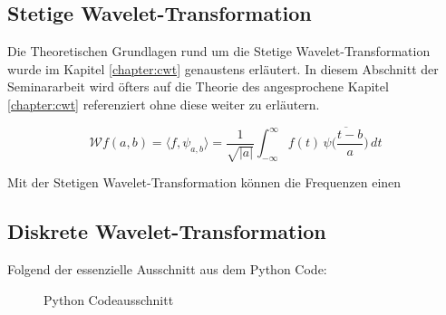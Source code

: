 
\subsection{Stetige Wavelet-Transformation}
Die Theoretischen Grundlagen rund um die Stetige Wavelet-Transformation wurde im Kapitel \ref{chapter:cwt} genaustens erläutert. 
In diesem Abschnitt der Seminararbeit wird öfters auf die Theorie des angesprochene Kapitel \ref{chapter:cwt} referenziert ohne diese weiter zu erläutern. 

\begin{equation}
\mathcal{W}f (a,b)
=
\langle f,\psi_{a,b}\rangle
=
\frac{1}{\sqrt{|a|}}\int_{-\infty}^\infty f(t)\,\overline{
	\psi\biggl(\frac{t-b}{a}\biggr)}\,dt
\label{eq:cwt}
\end{equation}

Mit der Stetigen Wavelet-Transformation können die Frequenzen einen 
\subsection{Diskrete Wavelet-Transformation}

\newpage
Folgend der essenzielle Ausschnitt aus dem Python Code:
\begin{figure}[h]
	\centering
	
	\caption{Python Codeausschnitt}
	\label{fig:python-code}
\end{figure}
\newpage